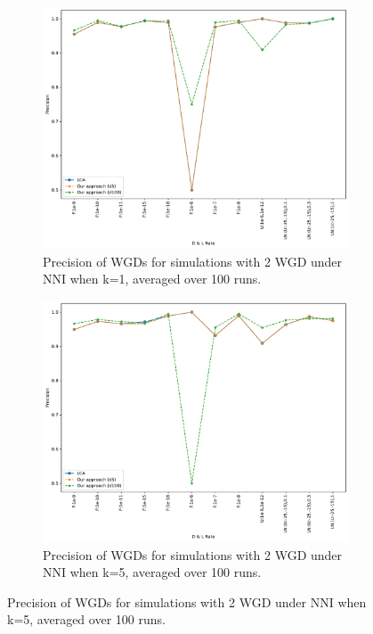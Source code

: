 \documentclass[10pt]{article}
\begin{document}
\begin{figure}[h!]
    \begin{subfigure}[b]{0.31\textwidth}
        \centering
        \includegraphics[width=\textwidth]{figs/precision-2W-NNI-K1-WGD-t20-t80-Avg.pdf}
        \caption{Precision of WGDs for simulations with 2 WGD under NNI when k=1, averaged over 100 runs.}
        \label{fig:precision-NNI-k1-2wgd}
    \end{subfigure}
    \hfill
    \begin{subfigure}[b]{0.31\textwidth}
        \centering
        \includegraphics[width=\textwidth]{figs/precision-2W-NNI-K5-WGD-t20-t80-Avg.pdf}
        \caption{Precision of WGDs for simulations with 2 WGD under NNI when k=5, averaged over 100 runs.}

\end{subfigure}
\end{figure}
\end{document}
